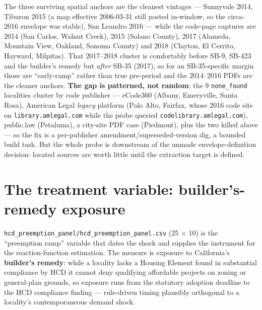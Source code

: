 \documentclass[11pt]{article}
\begin{document}
The three surviving spatial anchors are the cleanest vintages --- Sunnyvale 2014, Tiburon 2015 (a
map effective 2006-03-31 still posted in-window, so the circa-2016 envelope was stable), San
Leandro 2016 --- while the code-page captures are 2014 (San Carlos, Walnut Creek), 2015 (Solano
County), 2017 (Alameda, Mountain View, Oakland, Sonoma County) and 2018 (Clayton, El Cerrito,
Hayward, Milpitas). That 2017--2018 cluster is comfortably before SB-9, SB-423 and the builder's
remedy but \emph{after} SB-35 (2017), so for an SB-35-specific margin those are ``early-ramp''
rather than true pre-period and the 2014--2016 PDFs are the cleaner anchors. \textbf{The gap is
patterned, not random}: the 9 \texttt{none\_found} localities cluster by code publisher ---
eCode360 (Albany, Emeryville, Santa Rosa), American Legal \emph{legacy} platform (Palo Alto,
Fairfax, whose 2016 code sits on \texttt{library.amlegal.com} while the probe queried
\texttt{codelibrary.amlegal.com}), public.law (Petaluma), a city-site PDF case (Piedmont), plus
the two killed above --- so the fix is a per-publisher amendment/superseded-version dig, a bounded
build task. But the whole probe is downstream of the unmade envelope-definition decision: located
sources are worth little until the extraction target is defined.

\section{The treatment variable: builder's-remedy exposure}

\texttt{hcd\_preemption\_panel/hcd\_preemption\_panel.csv} (25 $\times$ 10) is the ``preemption
ramp'' variable that dates the shock and supplies the instrument for the reaction-function
estimation. The measure is exposure to California's \textbf{builder's remedy}: while a locality
lacks a Housing Element found in substantial compliance by HCD it cannot deny qualifying
affordable projects on zoning or general-plan grounds, so exposure runs from the statutory
adoption deadline to the HCD compliance finding --- rule-driven timing plausibly orthogonal to a
locality's contemporaneous demand shock.
\end{document}

